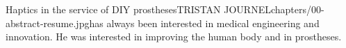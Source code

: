 

 
\begin{thesis}{Haptics in the service of DIY prostheses}{TRISTAN JOURNEL}{chapters/00-abstract-resume}{.jpg}{has always been interested in medical engineering and innovation. He was interested in improving the human body and in prostheses.}   
    
    
    
    
     
    
\end{thesis}


